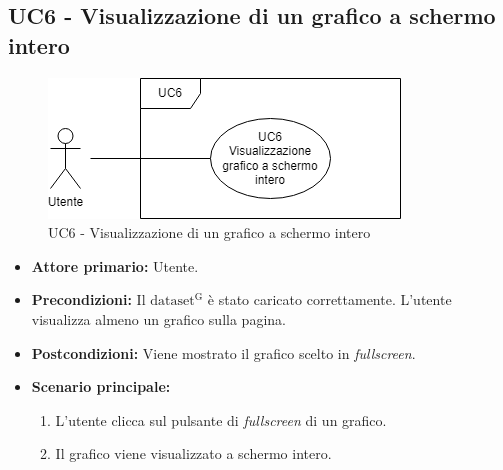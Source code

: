 \newpage


\subsection{UC6 - Visualizzazione di un grafico a schermo intero}
\begin{figure}[h!]
	\centering
	\includegraphics[scale=0.60]{../../assets/visualizzazione_fullscreen.png}
	\caption{UC6 - Visualizzazione di un grafico a schermo intero}
\end{figure}

\begin{itemize}
	\item \textbf{Attore primario:} Utente.
	\item \textbf{Precondizioni:} Il ${\mathrm{dataset^{G}}}$ è stato caricato correttamente. L'utente visualizza almeno un grafico sulla pagina. 
	\item \textbf{Postcondizioni:} 
	Viene mostrato il grafico scelto in \textit{fullscreen}.
	\item \textbf{Scenario principale:}
		\begin{enumerate}
			\item L'utente clicca sul pulsante di \textit{fullscreen} di un grafico.
			\item Il grafico viene visualizzato a schermo intero.
		\end{enumerate}
\end{itemize}
\newpage

